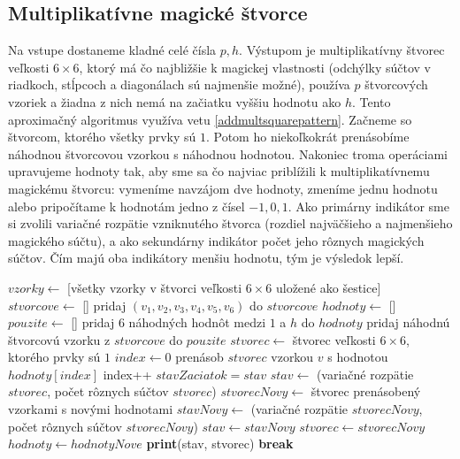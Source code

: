 \subsection{Multiplikatívne magické štvorce} 

\begin{alg}
\label{algsquare6x6mm}
Na vstupe dostaneme kladné celé čísla $p, h$. Výstupom je multiplikatívny štvorec veľkosti $6 \times 6$, ktorý má čo najbližšie k magickej vlastnosti (odchýlky súčtov v riadkoch, stĺpcoch a diagonálach sú najmenšie možné), používa $p$ štvorcových vzoriek a žiadna z nich nemá na začiatku vyššiu hodnotu ako $h$. Tento aproximačný algoritmus využíva vetu \ref{addmultsquarepattern}. Začneme so štvorcom, ktorého všetky prvky sú $1$. Potom ho niekoľkokrát prenásobíme náhodnou štvorcovou vzorkou s náhodnou hodnotou. Nakoniec troma operáciami upravujeme hodnoty tak, aby sme sa čo najviac priblížili k multiplikatívnemu magickému štvorcu: vymeníme navzájom dve hodnoty, zmeníme jednu hodnotu alebo pripočítame k hodnotám jedno z čísel $-1, 0, 1$. Ako primárny indikátor sme si zvolili variačné rozpätie vzniknutého štvorca (rozdiel najväčšieho a najmenšieho magického súčtu), a ako sekundárny indikátor počet jeho rôznych magických súčtov. Čím majú oba indikátory menšiu hodnotu, tým je výsledok lepší.
\end{alg}

\begin{algorithmic}
\STATE $vzorky \gets$ [všetky vzorky v štvorci veľkosti $6 \times 6$ uložené ako šestice]
\STATE $stvorcove \gets $ []
	\STATE pridaj $(v_1,v_2,v_3,v_4,v_5,v_6)$ do $stvorcove$
    \ENDIF
\ENDFOR
{}
	\STATE $hodnoty \gets$ []
	\STATE $pouzite \gets$ []
		\STATE pridaj $6$ náhodných hodnôt medzi $1$ a $h$ do $hodnoty$
		\STATE pridaj náhodnú štvorcovú vzorku z $stvorcove$ do $pouzite$
	\ENDFOR
		\STATE $stvorec \gets$ štvorec veľkosti $6 \times 6$, ktorého prvky sú $1$
		\STATE $index \gets 0$
				\STATE prenásob $stvorec$ vzorkou $v$ s hodnotou $hodnoty[index]$
				\STATE index++
			\ENDFOR
		\ENDFOR
			\STATE $stavZaciatok = stav$
			\STATE $stav \gets$ (variačné rozpätie $stvorec$, počet rôznych súčtov $stvorec$)
				\STATE $stvorecNovy \gets$ štvorec prenásobený vzorkami s novými hodnotami
				\STATE $stavNovy \gets$ (variačné rozpätie $stvorecNovy$, počet rôznych súčtov $stvorecNovy$)
					\STATE $stav \gets stavNovy$
					\STATE $stvorec \gets stvorecNovy$
					\STATE $hodnoty \gets hodnotyNove$
				\ENDIF
			\ENDFOR
				\STATE \textbf{print}(stav, stvorec)
				\STATE \textbf{break}
			\ENDIF
		\ENDIF
	\ENDWHILE
\ENDWHILE
\end{algorithmic}

